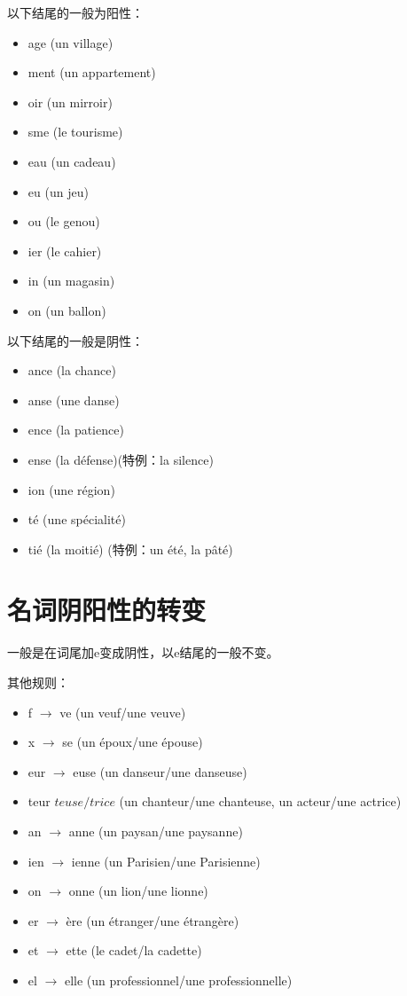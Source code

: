 以下结尾的一般为阳性：
\begin{itemize}
\item age (un village)
\item ment (un appartement)
\item oir (un mirroir)
\item sme (le tourisme)
\item eau (un cadeau)
\item eu (un jeu)
\item ou (le genou)
\item ier (le cahier)
\item in (un magasin)
\item on (un ballon)
\end{itemize}

以下结尾的一般是阴性：
\begin{itemize}
\item ance (la chance)
\item anse (une danse)
\item ence (la patience)
\item ense (la défense)(特例：la silence)
\item ion (une région)
\item té (une spécialité)
\item tié (la moitié) (特例：un été, la pâté)
\end{itemize}



\section{名词阴阳性的转变}
一般是在词尾加e变成阴性，以e结尾的一般不变。


其他规则：
\begin{itemize}
\item f $\rightarrow$ ve (un veuf/une veuve)
\item x $\rightarrow$ se (un époux/une épouse)
\item eur $\rightarrow$ euse (un danseur/une danseuse)
\item teur $teuse/trice$ (un chanteur/une chanteuse, un acteur/une
  actrice)
\item an $\rightarrow$ anne (un paysan/une paysanne)
\item ien $\rightarrow$ ienne (un Parisien/une Parisienne)
\item on $\rightarrow$ onne (un lion/une lionne)
\item er $\rightarrow$ ère (un étranger/une étrangère)
\item et $\rightarrow$ ette (le cadet/la cadette)
\item el $\rightarrow$ elle (un professionnel/une professionnelle)
\end{itemize}

